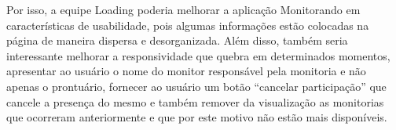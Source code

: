 Por isso, a equipe Loading poderia melhorar a aplicação Monitorando em características de usabilidade, pois algumas informações estão colocadas na página de maneira dispersa e desorganizada. Além disso, também seria interessante melhorar a responsividade que quebra em determinados momentos, apresentar ao usuário o nome do monitor responsável pela monitoria e não apenas o prontuário, fornecer ao usuário um botão “cancelar participação” que cancele a presença do mesmo e também remover da visualização as monitorias que ocorreram anteriormente e que por este motivo não estão mais disponíveis.